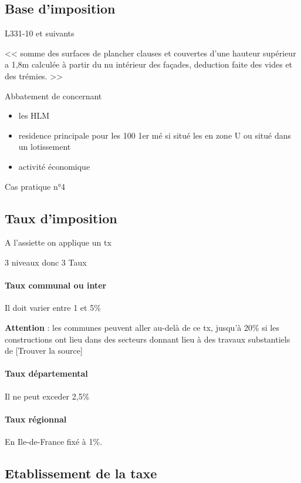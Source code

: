 	\subsection{Base d’imposition}

		L331-10 et suivants

		<< somme des surfaces de plancher clauses et couvertes d'une hauteur supérieur a 1,8m calculée à partir du nu intérieur des façades, deduction faite des vides et des trémies. >>

		Abbatement de  concernant
		\begin{itemize}
			\item les HLM
			\item residence principale pour les 100 1er mé si situé les en zone U ou situé dans un lotissement
			\item activité économique
		\end{itemize}

		Cas pratique n°4

	\subsection{Taux d’imposition}

		A l'assiette on applique un tx

		3 niveaux donc 3 Taux

		\paragraph{Taux communal ou inter} Il doit varier entre 1 et 5\%

			\textbf{Attention} : les communes peuvent aller au-delà de ce tx, jusqu'à 20\% si les constructions ont lieu dans des secteurs donnant lieu à des travaux substantiels de [Trouver la source]

		\paragraph{Taux départemental} Il ne peut exceder 2,5\%

		\paragraph{Taux régionnal} En Ile-de-France fixé à 1\%.

	\subsection{Etablissement de la taxe}

